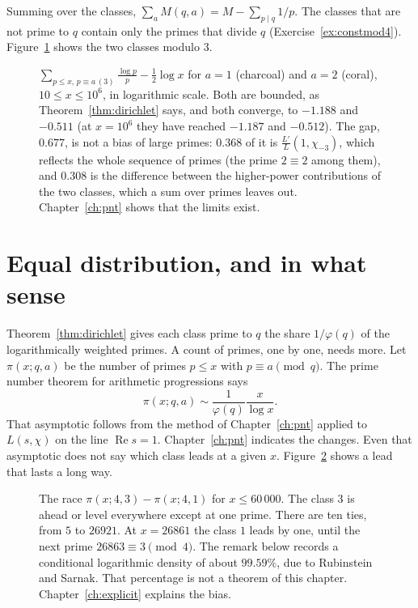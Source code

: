 Summing over the classes, $\sum_a M(q,a)=M-\sum_{p\mid q}1/p$. The classes that are not prime to $q$ contain only the primes that divide $q$ (Exercise~\ref{ex:constmod4}). Figure~\ref{fig:mertensprog} shows the two classes modulo $3$.

\begin{figure}[ht]
\centering
{}
\caption{$\sum_{p\le x,\,p\equiv a\,(3)}\frac{\log p}p-\frac12\log x$ for $a=1$ (charcoal) and $a=2$ (coral), $10\le x\le10^6$, in logarithmic scale. Both are bounded, as
Theorem~\ref{thm:dirichlet} says, and both converge, to $-1.188$ and $-0.511$ (at $x=10^6$ they have reached $-1.187$ and $-0.512$). The gap, $0.677$, is not a bias of large primes: $0.368$ of it is
$\frac{L'}L(1,\chi_{-3})$, which reflects the whole sequence of primes (the prime $2\equiv2$ among them), and $0.308$ is the difference between the higher-power contributions of the two classes, which a sum
over primes leaves out. Chapter~\ref{ch:pnt} shows that the limits exist.}
\label{fig:mertensprog}
\end{figure}

\section{Equal distribution, and in what sense}

Theorem~\ref{thm:dirichlet} gives each class prime to $q$ the share $1/\varphi(q)$ of the logarithmically weighted primes. A count of primes, one by one, needs more. Let $\pi(x;q,a)$ be the number of primes $p\le x$ with $p\equiv a\pmod q$. The prime number theorem for arithmetic progressions says
\[
\pi(x;q,a)\sim\frac1{\varphi(q)}\frac x{\log x}.
\]
That asymptotic follows from the method of Chapter~\ref{ch:pnt} applied to $L(s,\chi)$ on the line $\operatorname{Re}s=1$. Chapter~\ref{ch:pnt} indicates the changes. Even that asymptotic does not say which class leads at a given $x$. Figure~\ref{fig:race} shows a lead that lasts a long way.

\begin{figure}[ht]
\centering
{}
\caption{The race $\pi(x;4,3)-\pi(x;4,1)$ for $x\le60\,000$. The class $3$ is ahead or level everywhere except at one prime. There are ten ties, from $5$ to $26921$. At $x=26861$ the class $1$ leads by one, until the next prime $26863\equiv3\pmod4$. The remark below records a conditional logarithmic density of about $99.59\%$, due to Rubinstein and Sarnak. That percentage is not a theorem of this chapter. Chapter~\ref{ch:explicit} explains the bias.}
\label{fig:race}
\end{figure}

